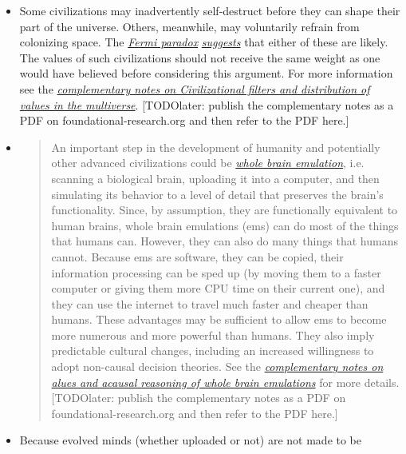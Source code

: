 \begin{itemize}
\item
  Some civilizations may inadvertently self-destruct before they can
  shape their part of the universe. Others, meanwhile, may voluntarily
  refrain from colonizing space. The
  \href{https://en.wikipedia.org/wiki/Fermi_paradox}{\emph{Fermi
  paradox}}
  \href{https://www.youtube.com/watch?v=aspMV6ERqpo}{\emph{suggests}}
  that either of these are likely. The values of such civilizations
  should not receive the same weight as one would have believed before
  considering this argument. For more information see the
  \href{https://docs.google.com/document/d/1br64tlYwZzic3UULWSD-c1TYTJjz0EY7_NC1jJWZ_HM/edit\#}{\emph{complementary
  notes on Civilizational filters and distribution of values in the
  multiverse}}. {[}TODOlater: publish the complementary notes as a PDF
  on foundational-research.org and then refer to the PDF here.{]}
\item
  \begin{quote}
  An important step in the development of humanity and potentially other
  advanced civilizations could be
  \href{https://en.wikipedia.org/wiki/Mind_uploading}{\emph{whole brain
  emulation}}, i.e. scanning a biological brain, uploading it into a
  computer, and then simulating its behavior to a level of detail that
  preserves the brain's functionality. Since, by assumption, they are
  functionally equivalent to human brains, whole brain emulations (ems)
  can do most of the things that humans can. However, they can also do
  many things that humans cannot. Because ems are software, they can be
  copied, their information processing can be sped up (by moving them to
  a faster computer or giving them more CPU time on their current one),
  and they can use the internet to travel much faster and cheaper than
  humans. These advantages may be sufficient to allow ems to become more
  numerous and more powerful than humans. They also imply predictable
  cultural changes, including an increased willingness to adopt
  non-causal decision theories. See the
  \href{https://docs.google.com/document/d/15hSCps-ArXuJu3T-azxOEQFnFbGgw09-1tG-4JIVJS4/edit}{\emph{complementary
  notes on alues and acausal reasoning of whole brain emulations}} for
  more details. {[}TODOlater: publish the complementary notes as a PDF
  on foundational-research.org and then refer to the PDF here.{]}
  \end{quote}
\item
  Because evolved minds (whether uploaded or not) are not made to be

\end{itemize}
